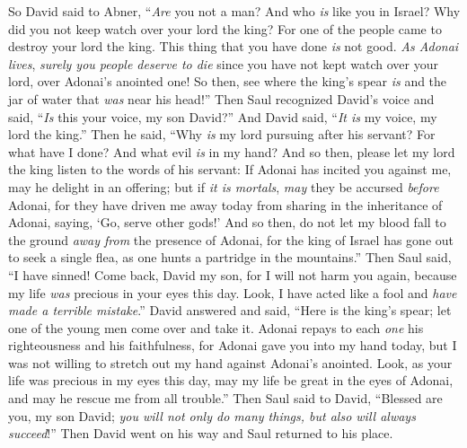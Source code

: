 \begin{biblechapter}
\verse So David said to Abner, “\textit{Are} you not a man? And who \textit{is} like you in Israel? Why did you not keep watch over your lord the king? For one of the people came to destroy your lord the king.
\verse This thing that you have done \textit{is} not good. \textit{As Adonai lives}, \textit{surely you people deserve to die} since you have not kept watch over your lord, over Adonai’s anointed one! So then, see where the king’s spear \textit{is} and the jar of water that \textit{was} near his head!”
\verse Then Saul recognized David’s voice and said, “\textit{Is} this your voice, my son David?” And David said, “\textit{It is} my voice, my lord the king.”
\verse Then he said, “Why \textit{is} my lord pursuing after his servant? For what have I done? And what evil \textit{is} in my hand?
\verse And so then, please let my lord the king listen to the words of his servant: If Adonai has incited you against me, may he delight in an offering; but if \textit{it is mortals}, \textit{may} they be accursed \textit{before} Adonai, for they have driven me away today from sharing in the inheritance of Adonai, saying, ‘Go, serve other gods!’
\verse And so then, do not let my blood fall to the ground \textit{away from} the presence of Adonai, for the king of Israel has gone out to seek a single flea, as one hunts a partridge in the mountains.”
\verse Then Saul said, “I have sinned! Come back, David my son, for I will not harm you again, because my life \textit{was} precious in your eyes this day. Look, I have acted like a fool and \textit{have made a terrible mistake}.”
\verse David answered and said, “Here is the king’s spear; let one of the young men come over and take it.
\verse Adonai repays to each \textit{one} his righteousness and his faithfulness, for Adonai gave you into my hand today, but I was not willing to stretch out my hand against Adonai’s anointed.
\verse Look, as your life was precious in my eyes this day, may my life be great in the eyes of Adonai, and may he rescue me from all trouble.”
\verse Then Saul said to David, “Blessed are you, my son David; \textit{you will not only do many things, but also will always succeed}!” Then David went on his way and Saul returned to his place.
\end{biblechapter}

